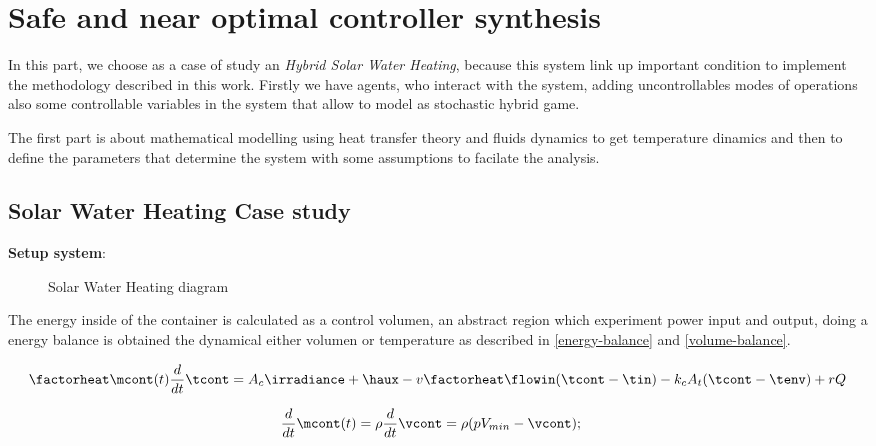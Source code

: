 
\chapter{Safe and near optimal controller synthesis}

\label{ch:proposal}
In this part, we choose as a case of study an \emph{Hybrid Solar Water
Heating}, because this system link up important condition to implement the
methodology described in this work. Firstly we have agents, who interact with 
the system, adding uncontrollables modes of operations also some controllable
variables in the system that allow to model as stochastic hybrid game.

The first part is about mathematical modelling using heat transfer
theory and fluids dynamics to get temperature dinamics and then 
to define the parameters that determine the system with some
assumptions to facilate the analysis.

\clearpage
\section{Solar Water Heating Case study}

\textbf{Setup system}:

\begin{figure}[!hbt]

\caption{Solar Water Heating diagram}
\end{figure}

The energy inside of the container is calculated as a control volumen, an abstract
region which experiment power input and output, doing a energy balance is obtained
the dynamical either volumen or temperature as described in \ref{energy-balance}
and \ref{volume-balance}.

\begin{equation} 
    \factorheat\mcont(t)\frac{d}{dt}\tcont =  A_c\irradiance + \haux - v\factorheat \flowin (\tcont-\tin) -   k_c A_t (\tcont-\tenv) + rQ
    \label{energy-balance}
\end{equation}

\begin{equation}
    \frac{d}{dt}\mcont(t) =  \rho \frac{d}{dt}\vcont = \rho (pV_{min} - \vcont); \quad
    \label{volume-balance}
\end{equation}

